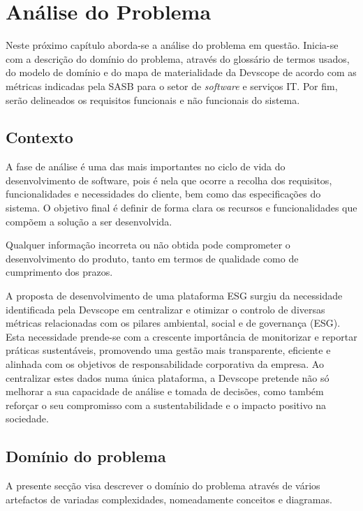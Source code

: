 
\chapter{Análise do Problema}
\label{sec:AP}

Neste próximo capítulo aborda-se a análise do problema em questão. Inicia-se com a descrição do domínio do problema, através do glossário de termos usados, do modelo de domínio e do mapa de materialidade da Devscope de acordo com as métricas indicadas pela \gls{SASB} para o setor de \textit{software} e serviços IT. Por fim, serão delineados os requisitos funcionais e não funcionais do sistema.

\section{Contexto}
\label{sec:Context}

A fase de análise é uma das mais importantes no ciclo de vida do desenvolvimento de software, pois é nela que ocorre a recolha dos requisitos, funcionalidades e necessidades do cliente, bem como das especificações do sistema. O objetivo final é definir de forma clara os recursos e funcionalidades que compõem a solução a ser desenvolvida.

Qualquer informação incorreta ou não obtida pode comprometer o desenvolvimento do produto, tanto em termos de qualidade como de cumprimento dos prazos.

A proposta de desenvolvimento de uma plataforma ESG surgiu da necessidade identificada pela Devscope em centralizar e otimizar o controlo de diversas métricas relacionadas com os pilares ambiental, social e de governança (ESG). Esta necessidade prende-se com a crescente importância de monitorizar e reportar práticas sustentáveis, promovendo uma gestão mais transparente, eficiente e alinhada com os objetivos de responsabilidade corporativa da empresa. Ao centralizar estes dados numa única plataforma, a Devscope pretende não só melhorar a sua capacidade de análise e tomada de decisões, como também reforçar o seu compromisso com a sustentabilidade e o impacto positivo na sociedade.

\section{Domínio do problema}
\label{sec:DP} 

A presente secção visa descrever o domínio do problema através de vários artefactos de variadas complexidades, nomeadamente conceitos e diagramas.

